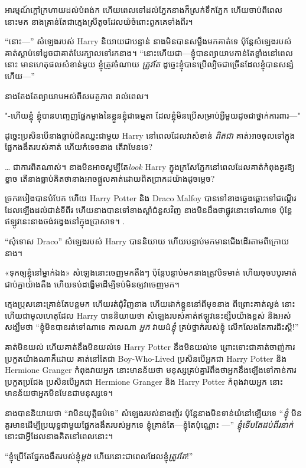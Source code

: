 {{អារម្មណ៍ក្តៅក្រហាយដល់បំពង់ក ហើយពេលទៅដល់ភ្នែកនាងក៏ស្រក់ទឹកភ្នែក ហើយចាប់ពីពេលនោះមក នាងគ្រាន់តែជាក្មេងស្រីតូចដែលយំចំពោះពួកគេទាំងពីរ។

“នោះ—” សំឡេងរបស់ Harry និយាយជាបន្ទាន់ នាងមិនបានសម្លឹងមកគាត់ទេ ប៉ុន្តែសំឡេងរបស់គាត់ស្តាប់ទៅដូចជាគាត់បែរក្បាលទៅរកនាង។ “នោះហើយជា—ខ្ញុំបានព្យាយាមកាន់តែខ្លាំងនៅពេលនោះ មានហេតុផលសំខាន់មួយ ខ្ញុំត្រូវចំណាយ \emph{ត្រូវតែ} ដូច្នេះខ្ញុំបានប្រើល្បិចជាច្រើនដែលខ្ញុំបានសន្សំហើយ—”

នាងតែងតែព្យាយាមអស់ពីសមត្ថភាព រាល់ពេល។

"-ហើយខ្ញុំ ខ្ញុំបានបញ្ចេញផ្នែកម្ខាងនៃខ្លួនខ្ញុំជាធម្មតា ដែលខ្ញុំមិនប្រើសម្រាប់អ្វីមួយដូចជាថ្នាក់ការពារ—"

ដូច្នេះប្រសិនបើនាងធ្លាប់ជិតឈ្នះជាមួយ Harry នៅពេលដែលវាសំខាន់ \emph{ពិតជា} គាត់អាចចូលទៅក្នុងផ្នែកងងឹតរបស់គាត់ ហើយកំទេចនាង តើវាមែនទេ?

… ជា​ការ​ពិត​ណាស់​។ នាងមិនអាចសូម្បីតែ\emph{look} Harry ក្នុងក្រសែភ្នែកនៅពេលដែលគាត់កំពុងគួរឱ្យខ្លាច តើនាងធ្លាប់គិតថានាងអាចផ្តួលគាត់ដោយពិតប្រាកដយ៉ាងដូចម្តេច?

ច្រករបៀងបានបំបែក ហើយ Harry Potter និង Draco Malfoy បានទៅខាងឆ្វេងឆ្ពោះទៅជណ្តើរដែលឡើងដល់ជាន់ទីពីរ ហើយនាងបានទៅខាងស្តាំជំនួសវិញ នាងមិនដឹងថាផ្លូវនោះទៅណាទេ ប៉ុន្តែឥឡូវនេះនាងចង់វង្វេងនៅក្នុងប្រាសាទ។ .

“សុំទោស Draco” សំឡេងរបស់ Harry បាននិយាយ ហើយបន្ទាប់មកមានជើងដើរតាមពីក្រោយនាង។

«ទុកឲ្យខ្ញុំនៅម្នាក់ឯង» សំឡេងនោះចេញមកតឹងៗ ប៉ុន្តែបន្ទាប់មកនាងត្រូវបិទមាត់ ហើយចុចបបូរមាត់ជាប់គ្នាយ៉ាងតឹង ហើយទប់ដង្ហើមដើម្បីទប់មិនឲ្យវាចេញមក។

ក្មេងប្រុសនោះគ្រាន់តែបន្តមក ហើយរត់ជុំវិញនាង ហើយដាក់ខ្លួននៅពីមុខនាង ពីព្រោះគាត់ល្ងង់ នោះហើយជាមូលហេតុដែល Harry បាននិយាយថា សំឡេងរបស់គាត់ឥឡូវនេះខ្សឹបយ៉ាងខ្ពស់ និងអស់សង្ឃឹមថា “ខ្ញុំមិនបានរត់ទៅណាទេ កាលណា \emph{អ្នក} វាយដំ\emph{ខ្ញុំ} គ្រប់ថ្នាក់របស់ខ្ញុំ លើកលែងតែការជិះស្គី!”

គាត់មិនយល់ ហើយគាត់នឹងមិនយល់ទេ Harry Potter នឹងមិនយល់ទេ ព្រោះទោះជាគាត់ចាញ់ការប្រកួតយ៉ាងណាក៏ដោយ គាត់នៅតែជា Boy-Who-Lived ប្រសិនបើអ្នកជា Harry Potter និង Hermione Granger កំពុងវាយអ្នក នោះមានន័យថា មនុស្សគ្រប់គ្នារំពឹងថាអ្នកនឹងឡើងទៅកាន់ការប្រកួតប្រជែង ប្រសិនបើអ្នកជា Hermione Granger និង Harry Potter កំពុងវាយអ្នក នោះមានន័យថាអ្នកមិនមែនជាមនុស្សទេ។

នាងបាននិយាយថា “វាមិនយុត្តិធម៌ទេ” សំឡេងរបស់នាងញ័រ ប៉ុន្តែនាងមិនទាន់យំនៅឡើយទេ “\emph{ខ្ញុំ} មិនគួរមានដើម្បីប្រយុទ្ធជាមួយផ្នែកងងឹតរបស់អ្នកទេ ខ្ញុំគ្រាន់តែ—ខ្ញុំតែប៉ុណ្ណោះ —” \emph{ខ្ញុំទើបតែដប់ពីរនាក់} នោះជាអ្វីដែលនាងគិតនៅពេលនោះ។

“ខ្ញុំប្រើតែផ្នែកងងឹតរបស់ខ្ញុំ\emph{ម្តង} ហើយនោះជាពេលដែលខ្ញុំ\emph{ត្រូវតែ}!”

}}
